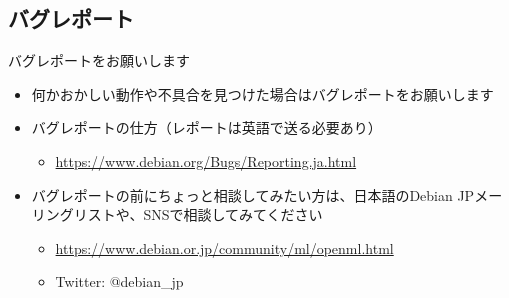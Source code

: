 \subsection{バグレポート}

\begin{frame}{バグレポートをお願いします}%
  \begin{itemize}
  \item 何かおかしい動作や不具合を見つけた場合はバグレポートをお願いします
  \item バグレポートの仕方（レポートは英語で送る必要あり）
    \begin{itemize}
    \item \url{https://www.debian.org/Bugs/Reporting.ja.html}
    \end{itemize}
  \item バグレポートの前にちょっと相談してみたい方は、日本語のDebian JPメーリングリストや、SNSで相談してみてください
    \begin{itemize}
    \item \url{https://www.debian.or.jp/community/ml/openml.html}
    \item Twitter: @debian\_jp
    \end{itemize}
  \end{itemize}
\end{frame}










